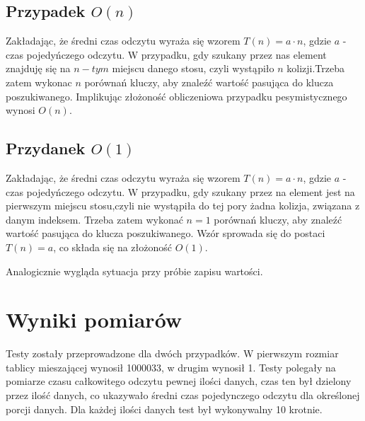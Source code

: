 \documentclass[12pt,a4paper,titlepage]{article}
\begin{document}
\subsection{Przypadek $O(n)$} 
Zakładając, że średni czas odczytu wyraża się wzorem $T(n) = a\cdot n$,\newline
gdzie $a$ - czas pojedyńczego odczytu.\newline
W przypadku, gdy szukany przez nas element znajduję się na $n-tym$ miejscu danego stosu, czyli wystąpiło $n$ kolizji.\newline Trzeba zatem wykonac $n$ porównań kluczy, aby znaleźć wartość pasująca do klucza poszukiwanego.\newline
Implikując złożoność obliczeniowa przypadku pesymistycznego wynosi $O(n)$.
\subsection{Przydanek $O(1)$} 
Zakładając, że średni czas odczytu wyraża się wzorem $T(n) = a\cdot n$,\newline
gdzie $a$ - czas pojedyńczego odczytu.\newline
W przypadku, gdy szukany przez na element jest na pierwszym miejscu stosu,czyli nie wystąpiła do tej pory żadna kolizja, związana z danym indeksem.\newline
Trzeba zatem wykonać $n=1$ porównań kluczy, aby znaleźć wartość pasująca do klucza poszukiwanego.\newline
Wzór sprowada się do postaci $T(n) = a$, co składa się na złożoność $O(1)$.

Analogicznie wygląda sytuacja przy próbie zapisu wartości.

\section{Wyniki pomiarów}
Testy zostały przeprowadzone dla dwóch przypadków.
W pierwszym rozmiar tablicy mieszającej wynosił 1000033, w drugim wynosił 1.\newline
Testy polegały na pomiarze czasu całkowitego odczytu pewnej ilości danych, czas ten był dzielony przez ilość danych, co ukazywało średni czas pojedynczego odczytu dla określonej porcji danych.\newline
Dla każdej ilości danych test był wykonywalny 10 krotnie.
\end{document}
